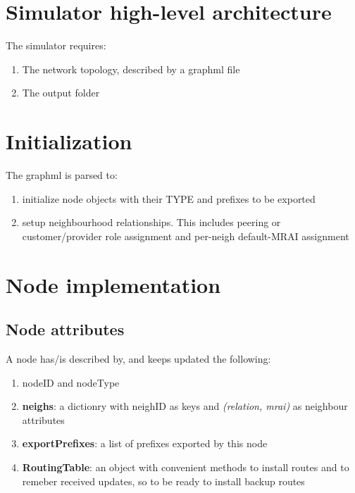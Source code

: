 \documentclass[fleqn,10pt]{SelfArx} %
\begin{document}
\flushbottom %
\maketitle %
\thispagestyle{empty} %

\section{Simulator high-level architecture} 
The simulator requires:
\begin{enumerate}[noitemsep]
  \item The network topology, described by a graphml file
  \item The output folder
\end{enumerate}

\section{Initialization}
The graphml is parsed to:
\begin{enumerate}[noitemsep]
  \item initialize node objects with their TYPE and prefixes to be exported
  \item setup neighbourhood relationships. This includes peering or customer/provider role assignment and per-neigh default-MRAI assignment
\end{enumerate}

\section{Node implementation}\label{sec:nodeLogic}

\subsection*{Node attributes}
A node has/is described by, and keeps updated the following:
\begin{enumerate}[noitemsep]
  \item nodeID and nodeType
  \item \textbf{neighs}: a dictionry with neighID as keys and \textit{(relation, mrai)} as neighbour attributes
  \item \textbf{exportPrefixes}: a list of prefixes exported by this node
  \item \textbf{RoutingTable}: an object with convenient methods to install routes and to remeber received updates, so to be ready to install backup routes
\end{enumerate}
\end{document}
